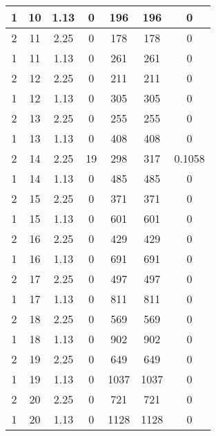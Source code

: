 \documentclass[letterpaper, 12pt]{article}
\begin{document}
\begin{longtable}{|c|c|c|c|c|c|c|}
\hline
1 & 10 & 1.13 & 0 & 196 & 196 & 0 \\
\hline
2 & 11 & 2.25 & 0 & 178 & 178 & 0 \\
\hline
1 & 11 & 1.13 & 0 & 261 & 261 & 0 \\
\hline
2 & 12 & 2.25 & 0 & 211 & 211 & 0 \\
\hline
1 & 12 & 1.13 & 0 & 305 & 305 & 0 \\
\hline
2 & 13 & 2.25 & 0 & 255 & 255 & 0 \\
\hline
1 & 13 & 1.13 & 0 & 408 & 408 & 0 \\
\hline
2 & 14 & 2.25 & 19 & 298 & 317 & 0.1058 \\
\hline
1 & 14 & 1.13 & 0 & 485 & 485 & 0 \\
\hline
2 & 15 & 2.25 & 0 & 371 & 371 & 0 \\
\hline
1 & 15 & 1.13 & 0 & 601 & 601 & 0 \\
\hline
2 & 16 & 2.25 & 0 & 429 & 429 & 0 \\
\hline
1 & 16 & 1.13 & 0 & 691 & 691 & 0 \\
\hline
2 & 17 & 2.25 & 0 & 497 & 497 & 0 \\
\hline
1 & 17 & 1.13 & 0 & 811 & 811 & 0 \\
\hline
2 & 18 & 2.25 & 0 & 569 & 569 & 0 \\
\hline
1 & 18 & 1.13 & 0 & 902 & 902 & 0 \\
\hline
2 & 19 & 2.25 & 0 & 649 & 649 & 0 \\
\hline
1 & 19 & 1.13 & 0 & 1037 & 1037 & 0 \\
\hline
2 & 20 & 2.25 & 0 & 721 & 721 & 0 \\
\hline
1 & 20 & 1.13 & 0 & 1128 & 1128 & 0 \\
\hline
\end{longtable}
\end{document}
